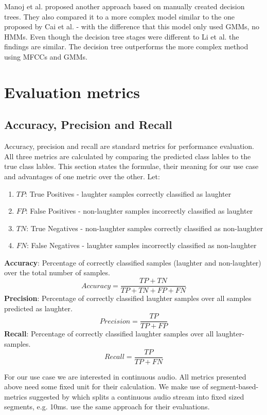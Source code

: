 \documentclass[bsc,frontabs,parskip,deptreport]{infthesis}
\begin{document}
Manoj et al. \citep{manoj2011novel} proposed another approach based on manually created decision trees. They also compared it to a more complex model similar to the one proposed by Cai et al. \citep{cai2003highlight} - with the difference that this model only used GMMs, no HMMs.
Even though the decision tree stages were different to Li et al. \citep{li2009characteristics} the findings are similar. The decision tree outperforms the more complex method using MFCCs and GMMs.  

\section{Evaluation metrics} \label{theory}
\subsection{Accuracy, Precision and Recall} \label{sec:acc-prec-rec}
Accuracy, precision and recall are standard metrics for performance evaluation.
All three metrics are calculated by comparing the predicted class lables to the true class lables.
This section states the formulae, their meaning for our use case and advantages of one metric over the other.
Let:
\begin{enumerate}
    \item $TP$: True Positives - laughter samples correctly classified as laughter
    \item $FP$: False Positives - non-laughter samples incorrectly classified as laughter
    \item $TN$: True Negatives - non-laughter samples correctly classified as non-laughter
    \item $FN$: False Negatives - laughter samples incorrectly classified as non-laughter
\end{enumerate}
\textbf{Accuracy}: Percentage of correctly classified samples (laughter and non-laughter) over the total number of samples.
$$Accuracy = \frac{TP+TN}{TP+TN+FP+FN}$$
\textbf{Precision}: Percentage of correctly classified laughter samples over all samples predicted as laughter.
$$Precision = \frac{TP}{TP+FP}$$
\textbf{Recall}: Percentage of correctly classified laughter samples over all laughter-samples.
$$Recall = \frac{TP}{TP+FN}$$

For our use case we are interested in continuous audio. All metrics presented above need some fixed unit for their calculation. We make use of segment-based-metrics suggested by \citep{mesaros2016metrics} which splits a continuous audio stream into fixed sized segments, e.g. 10ms. \citeauthor{gillick2021robust} use the same approach for their evaluations.
\end{document}
